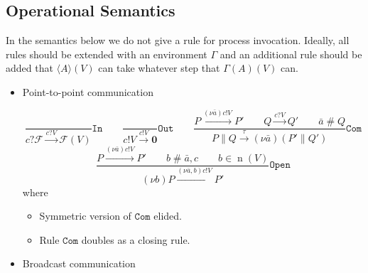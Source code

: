 \documentclass{article}
\newcommand{\pOut}{{!}}
\newcommand{\pIn}{{?}}
\newcommand{\new}[2]{(\nu\!#1) #2}
\newcommand{\freshFor}{\mathrel{\#}}
\newcommand{\nil}{\mathbf{0}}
\newcommand{\invoke}[1]{\langle #1 \rangle}
\DeclareMathOperator{\n}{n}
\begin{document}
\subsection{Operational Semantics}

In the semantics below we do not give a rule for process invocation. Ideally,
all rules should be extended with an environment $\Gamma$ and an additional rule
should be added that $\invoke{A}(V)$ can take whatever step that $\Gamma(A)(V)$
can.

\begin{itemize}

\item Point-to-point communication

\begin{equation*}
%
%
\frac{
}{
c \pIn \mathcal{F} \xrightarrow{c \pIn V} \mathcal{F}(V)
}
\mathtt{In}
%
\qquad
%
%
\frac{
}{
c \pOut V \xrightarrow{c \pOut V} \nil
}
\mathtt{Out}
%
\qquad
%
\frac{
P \xrightarrow{\new{\bar{a}}{c \pOut V}} P' \qquad
Q \xrightarrow{c \pIn V} Q' \qquad
\bar{a} \freshFor Q
}{
P \parallel Q \xrightarrow{\tau} \new{\bar{a}}{(P' \parallel Q')}
}
\mathtt{Com}
%
\end{equation*}
%
\begin{equation*}
\frac{
P \xrightarrow{\new{\bar{a}}{c \pOut V}} P' \qquad
b \freshFor \bar{a}, c \qquad
b \in \n(V)
}{
\new{b}{P} \xrightarrow{\new{\bar{a},b}{c \pOut V}} P'
}
\mathtt{Open}
\end{equation*}
%
where
%
\begin{itemize}
\item Symmetric version of $\mathtt{Com}$ elided.
\item Rule $\mathtt{Com}$ doubles as a closing rule.
\end{itemize}


\item Broadcast communication


\end{itemize}
\end{document}
